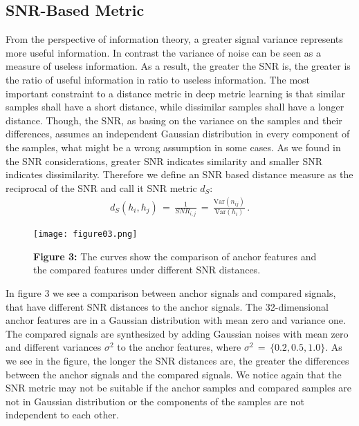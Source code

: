 \documentclass[12pt,paper=a4]{scrartcl}
\theoremstyle{break}
\begin{document}
\subsection{SNR-Based Metric}
From the perspective of information theory, a greater signal variance represents more useful information. In contrast the variance of noise can be seen as a measure of useless information. As a result, the greater the SNR is, the greater is the ratio of useful information in ratio to useless information. The most important constraint to a distance metric in deep metric learning is that similar samples shall have a short distance, while dissimilar samples shall have a longer distance. Though, the SNR, as basing on the variance on the samples and their differences, assumes an independent Gaussian distribution in every component of the samples, what might be a wrong assumption in some cases. As we found in the SNR considerations, greater SNR indicates similarity and smaller SNR indicates dissimilarity. Therefore we define an SNR based distance measure as the reciprocal of the SNR and call it SNR metric $d_S$:
\begin{align}
d_S(h_i,h_j)\,=\,\frac{1}{SNR_{i,j}}\,=\,\frac{\mathrm{Var}(n_{ij})}{\mathrm{Var}(h_i)}\,.
\end{align}
\begin{figure}[h]
	\centering
  \texttt{[image: figure03.png]}
  \caption{\textbf{Figure 3:} The curves show the comparison of anchor features and the compared features under different SNR distances.}
\end{figure}
In figure 3 we see a comparison between anchor signals and compared signals, that have different SNR distances to the anchor signals. The 32-dimensional anchor features are in a Gaussian distribution with mean zero and variance one. The compared signals are synthesized by adding Gaussian noises with mean zero and different variances $\sigma^2$ to the anchor features, where $\sigma^2\,=\,\{0.2,0.5,1.0\}$. As we see in the figure, the longer the SNR distances are, the greater the differences between the anchor signals and the compared signals. We notice again that the SNR metric may not be suitable if the anchor samples and compared samples are not in Gaussian distribution or the components of the samples are not independent to each other.
\end{document}
